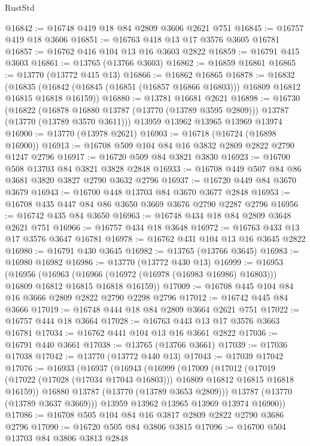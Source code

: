 \begin{lexlean}{RustStd}
\begin{coremodule}
@16842 := @16748 @419 @18 @84 @2809 @3606 @2621 @751
@16845 := @16757 @419 @18 @3606
@16851 := @16763 @418 @13 @17 @3576 @3605 @16781
@16857 := @16762 @416 @104 @13 @16 @3603 @2822
@16859 := @16791 @415 @3603
@16861 := @13765 (@13766 @3603)
@16862 := @16859 @16861
@16865 := @13770 (@13772 @415 @13)
@16866 := @16862 @16865
@16878 := @16832
    (@16835 (@16842 (@16845 (@16851 (@16857 @16866 @16803))) @16809 @16812 @16815 @16818 @16159))
@16880 := @13781 @16681 @2621
@16898 := @16730
    (@16822
      (@16878 @16880 @13787 (@13770 (@13789 @3595 @2809)))
      @13787
      (@13770 (@13789 @3570 @3611)))
    @13959
    @13962
    @13965
    @13969
    @13974
@16900 := @13770 (@13978 @2621)
@16903 := @16718 (@16724 (@16898 @16900))
@16913 := @16708 @509 @104 @84 @16 @3832 @2809 @2822 @2790 @1247 @2796
@16917 := @16720 @509 @84 @3821 @3830
@16923 := @16700 @508 @13703 @84 @3821 @3828 @2848
@16933 := @16708 @449 @507 @84 @86 @3681 @3820 @3827 @2790 @3632 @2796
@16937 := @16720 @449 @84 @3670 @3679
@16943 := @16700 @448 @13703 @84 @3670 @3677 @2848
@16953 := @16708 @435 @447 @84 @86 @3650 @3669 @3676 @2790 @2287 @2796
@16956 := @16742 @435 @84 @3650
@16963 := @16748 @434 @18 @84 @2809 @3648 @2621 @751
@16966 := @16757 @434 @18 @3648
@16972 := @16763 @433 @13 @17 @3576 @3647 @16781
@16978 := @16762 @431 @104 @13 @16 @3645 @2822
@16980 := @16791 @430 @3645
@16982 := @13765 (@13766 @3645)
@16983 := @16980 @16982
@16986 := @13770 (@13772 @430 @13)
@16999 := @16953
    (@16956
      (@16963 (@16966 (@16972 (@16978 (@16983 @16986) @16803))) @16809 @16812 @16815 @16818 @16159))
@17009 := @16708 @445 @104 @84 @16 @3666 @2809 @2822 @2790 @2298 @2796
@17012 := @16742 @445 @84 @3666
@17019 := @16748 @444 @18 @84 @2809 @3664 @2621 @751
@17022 := @16757 @444 @18 @3664
@17028 := @16763 @443 @13 @17 @3576 @3663 @16781
@17034 := @16762 @441 @104 @13 @16 @3661 @2822
@17036 := @16791 @440 @3661
@17038 := @13765 (@13766 @3661)
@17039 := @17036 @17038
@17042 := @13770 (@13772 @440 @13)
@17043 := @17039 @17042
@17076 := @16933
    (@16937
      (@16943
        (@16999
          (@17009
            (@17012
              (@17019 (@17022 (@17028 (@17034 @17043 @16803))) @16809 @16812 @16815 @16818 @16159))
            @16880
            @13787
            (@13770 (@13789 @3653 @2809)))
          @13787
          (@13770 (@13789 @3637 @3669)))
        @13959
        @13962
        @13965
        @13969
        @13974
        @16900))
@17086 := @16708 @505 @104 @84 @16 @3817 @2809 @2822 @2790 @3686 @2796
@17090 := @16720 @505 @84 @3806 @3815
@17096 := @16700 @504 @13703 @84 @3806 @3813 @2848

\end{coremodule}
\end{lexlean}
